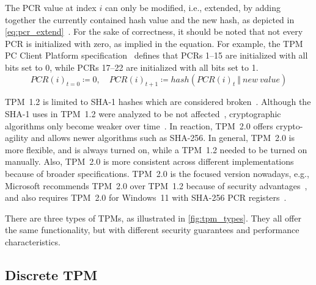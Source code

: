 The PCR value at index \(i\) can only be modified, i.e., extended, by adding together the currently contained hash value and the new hash, as depicted in \autoref{eq:pcr_extend}~\cite{tpm}. For the sake of correctness, it should be noted that not every PCR is initialized with zero, as implied in the equation. For example, the TPM PC Client Platform specification~\cite{tcgPcClient} defines that PCRs 1--15 are initialized with all bits set to 0, while PCRs 17--22 are initialized with all bits set to 1.
\begin{equation}
  \label{eq:pcr_extend}
PCR(i)_{t=0} \coloneqq 0,\quad PCR(i)_{t+1} \coloneqq hash(PCR(i)_t\ \Vert\ new\ value)
\end{equation}

%


TPM~1.2 is limited to SHA-1 hashes which are considered broken~\cite{cryptoeprint:2005/010, Wang2005, Stevens2017}. Although the SHA-1 uses in TPM~1.2 were analyzed to be not affected~\cite{sha1tpm12}, cryptographic algorithms only become weaker over time~\cite{Arthur2015}. In reaction, TPM~2.0 offers crypto-agility and allows newer algorithms such as SHA-256. In general, TPM~2.0 is more flexible, and is always turned on, while a TPM~1.2 needed to be turned on manually. Also, TPM~2.0 is more consistent across different implementations because of broader specifications.
TPM~2.0 is the focused version nowadays, e.g., Microsoft recommends TPM~2.0 over TPM~1.2 because of security advantages~\cite{micrec}, and also requires TPM~2.0 for Windows~11 with SHA-256 PCR registers~\cite{win11req}.




There are three types of TPMs, as illustrated in \autoref{fig:tpm_types}. They all offer the same functionality, but with different security guarantees and performance characteristics.



\subsection{Discrete TPM}

